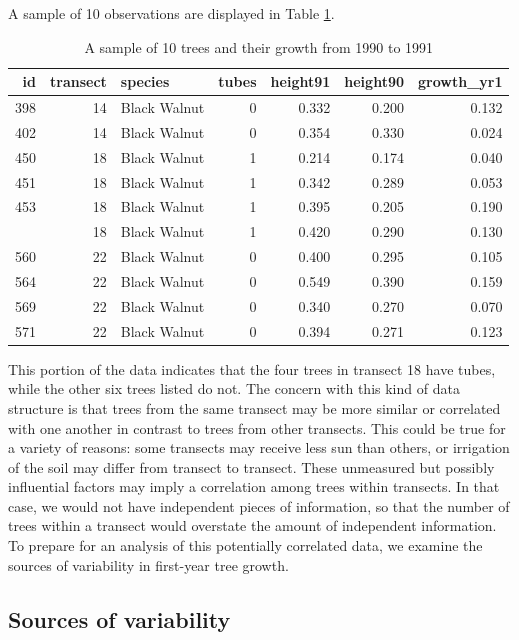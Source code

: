 \documentclass[
]{krantz}
\begin{document}
A sample of 10 observations are displayed in Table \ref{tab:treeTubeTab}.

\begin{table}[t]

\caption{\label{tab:treeTubeTab}A sample of 10 trees and their growth from 1990 to 1991}
\centering
\begin{tabular}{rrlrrrr}
\toprule
id & transect & species & tubes & height91 & height90 & growth\_yr1\\
\midrule
398 & 14 & Black Walnut & 0 & 0.332 & 0.200 & 0.132\\
402 & 14 & Black Walnut & 0 & 0.354 & 0.330 & 0.024\\
450 & 18 & Black Walnut & 1 & 0.214 & 0.174 & 0.040\\
451 & 18 & Black Walnut & 1 & 0.342 & 0.289 & 0.053\\
453 & 18 & Black Walnut & 1 & 0.395 & 0.205 & 0.190\\
\addlinespace
458 & 18 & Black Walnut & 1 & 0.420 & 0.290 & 0.130\\
560 & 22 & Black Walnut & 0 & 0.400 & 0.295 & 0.105\\
564 & 22 & Black Walnut & 0 & 0.549 & 0.390 & 0.159\\
569 & 22 & Black Walnut & 0 & 0.340 & 0.270 & 0.070\\
571 & 22 & Black Walnut & 0 & 0.394 & 0.271 & 0.123\\
\bottomrule
\end{tabular}
\end{table}

This portion of the data indicates that the four trees in transect 18 have tubes, while the other six trees listed do not. The concern with this kind of data structure is that trees from the same transect may be more similar or correlated with one another in contrast to trees from other transects. This could be true for a variety of reasons: some transects may receive less sun than others, or irrigation of the soil may differ from transect to transect. These unmeasured but possibly influential factors may imply a correlation among trees within transects. In that case, we would not have independent pieces of information, so that the number of trees within a transect would overstate the amount of independent information. To prepare for an analysis of this potentially correlated data, we examine the sources of variability in first-year tree growth.

\hypertarget{sources-of-variability-1}{%
\subsection{Sources of variability}\label{sources-of-variability-1}}
\end{document}
